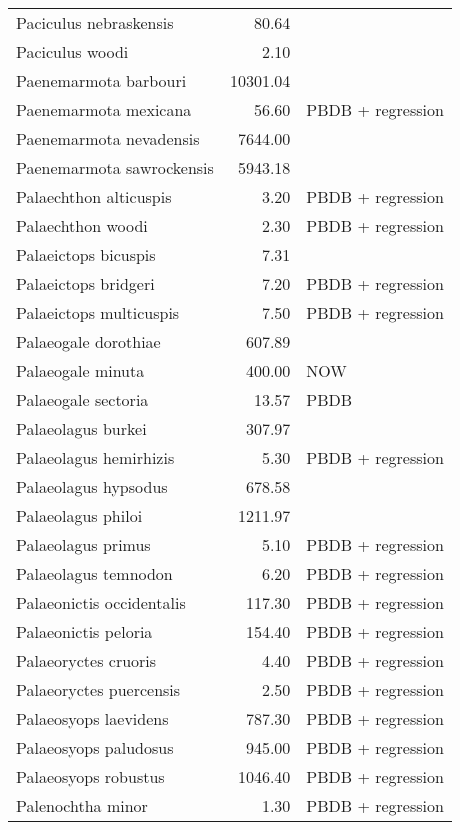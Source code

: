 \begin{table}[ht]
\begin{tabular}{lrl}
  Paciculus nebraskensis & 80.64 & \cite{Tomiya2013} \\ 
  Paciculus woodi & 2.10 & \cite{Korth1993} \\ 
  Paenemarmota barbouri & 10301.04 & \cite{Tomiya2013} \\ 
  Paenemarmota mexicana & 56.60 & PBDB + regression \\ 
  Paenemarmota nevadensis & 7644.00 & \cite{McKenna2011} \\ 
  Paenemarmota sawrockensis & 5943.18 & \cite{Tomiya2013} \\ 
  Palaechthon alticuspis & 3.20 & PBDB + regression \\ 
  Palaechthon woodi & 2.30 & PBDB + regression \\ 
  Palaeictops bicuspis & 7.31 & \cite{Simons1960} \\ 
  Palaeictops bridgeri & 7.20 & PBDB + regression \\ 
  Palaeictops multicuspis & 7.50 & PBDB + regression \\ 
  Palaeogale dorothiae & 607.89 & \cite{Tomiya2013} \\ 
  Palaeogale minuta & 400.00 & NOW \\ 
  Palaeogale sectoria & 13.57 & PBDB \\ 
  Palaeolagus burkei & 307.97 & \cite{Tomiya2013} \\ 
  Palaeolagus hemirhizis & 5.30 & PBDB + regression \\ 
  Palaeolagus hypsodus & 678.58 & \cite{Tomiya2013} \\ 
  Palaeolagus philoi & 1211.97 & \cite{Tomiya2013} \\ 
  Palaeolagus primus & 5.10 & PBDB + regression \\ 
  Palaeolagus temnodon & 6.20 & PBDB + regression \\ 
  Palaeonictis occidentalis & 117.30 & PBDB + regression \\ 
  Palaeonictis peloria & 154.40 & PBDB + regression \\ 
  Palaeoryctes cruoris & 4.40 & PBDB + regression \\ 
  Palaeoryctes puercensis & 2.50 & PBDB + regression \\ 
  Palaeosyops laevidens & 787.30 & PBDB + regression \\ 
  Palaeosyops paludosus & 945.00 & PBDB + regression \\ 
  Palaeosyops robustus & 1046.40 & PBDB + regression \\ 
  Palenochtha minor & 1.30 & PBDB + regression \\ 

\end{tabular}
\end{table}
